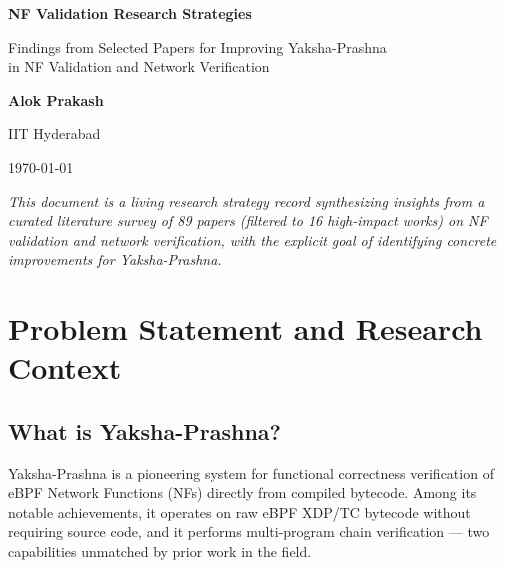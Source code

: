 \documentclass[12pt, a4paper]{article}
\begin{document}

\begin{titlepage}
  \centering
  \vspace*{2cm}
  {\Huge\bfseries\color{ypblue} NF Validation Research Strategies\par}
  \vspace{0.5cm}
  {\large\color{darkgray} Findings from Selected Papers for Improving Yaksha-Prashna\\
  in NF Validation and Network Verification\par}
  \vspace{2cm}
  {\large\bfseries Alok Prakash\par}
  \vspace{0.5cm}
  {\normalsize IIT Hyderabad \par}
  \vspace{0.3cm}
  {\normalsize \today\par}
  \vspace{3cm}
  \begin{mdframed}[backgroundcolor=lightgray, linecolor=ypblue, linewidth=1.5pt]
    \centering
    \small\textit{This document is a living research strategy record synthesizing insights
    from a curated literature survey of 89 papers (filtered to 16 high-impact works)
    on NF validation and network verification, with the explicit goal of identifying
    concrete improvements for Yaksha-Prashna.}
  \end{mdframed}
\end{titlepage}

\tableofcontents
\newpage

\section{Problem Statement and Research Context}
\label{sec:problem}

\subsection{What is Yaksha-Prashna?}

Yaksha-Prashna is a pioneering system for functional correctness verification of eBPF Network Functions (NFs) directly from compiled bytecode. Among its notable achievements, it operates on raw eBPF XDP/TC bytecode without requiring source code, and it performs multi-program chain verification — two capabilities unmatched by prior work in the field.
\end{document}
